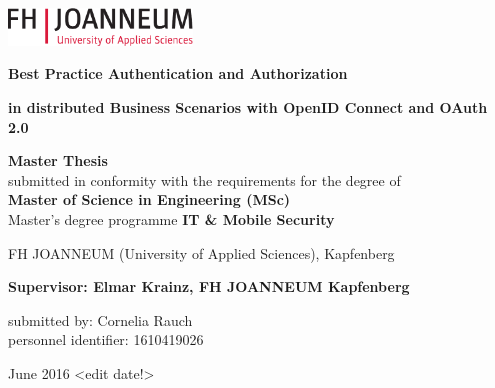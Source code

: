 \chapterend

\begin{titlepage}

\begin{center}
\includegraphics[height=1cm]{images/logo_FHJ_100mm_cmyk}
\hfill

\mbox{}\vfill

  \large

  {\huge\bf Best Practice Authentication and Authorization}
  
  \vspace{0.1cm}    
  {\small\bf in distributed Business Scenarios with OpenID Connect and OAuth 2.0 }

  \vspace{2.0cm}

  {\bf Master Thesis}\\
submitted in conformity with the requirements for the degree of\\
{\bf Master of Science in Engineering (MSc)}\\
Master's degree programme {\bf IT \& Mobile Security\\}

  \vspace{0.5cm}

 FH JOANNEUM  (University of Applied Sciences), Kapfenberg

  \vspace{1.5cm}

  \mbox{}

  {\bf Supervisor: Elmar Krainz, FH JOANNEUM Kapfenberg

  submitted by: Cornelia Rauch\\
  personnel identifier: 1610419026}

  \vspace{1.5cm}

   June 2016 <edit date!>

\end{center}
\vfill\mbox{}


\end{titlepage}




